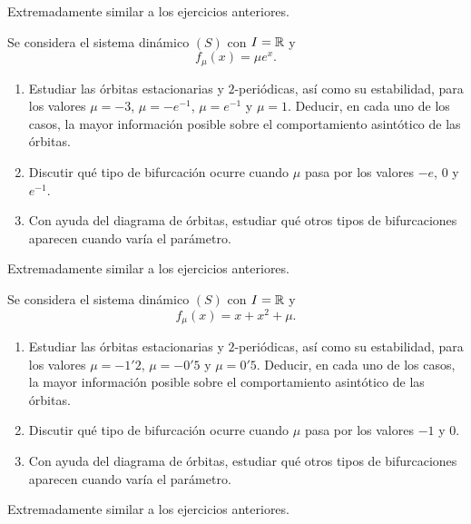 \documentclass[11pt]{report}
\begin{document}
\begin{solution}
    Extremadamente similar a los ejercicios anteriores.
\end{solution}

\begin{exercise}
    Se considera el sistema dinámico $(S)$ con $I = \mathbb R$ y
    \[f_\mu (x) = \mu e^x.\]
    \begin{enumerate}
        \item Estudiar las órbitas estacionarias y $2$-periódicas, así como su estabilidad, para los valores $\mu = -3$, $\mu = -e^{-1}$, $\mu = e^{-1}$ y $\mu = 1$. Deducir, en cada uno de los casos, la mayor información posible sobre el comportamiento asintótico de las órbitas.
        \item Discutir qué tipo de bifurcación ocurre cuando $\mu$ pasa por los valores $-e$, $0$ y $e^{-1}$.
        \item Con ayuda del diagrama de órbitas, estudiar qué otros tipos de bifurcaciones aparecen cuando varía el parámetro.
    \end{enumerate}
\end{exercise}

\begin{solution}
    Extremadamente similar a los ejercicios anteriores.
\end{solution}

\begin{exercise}
    Se considera el sistema dinámico $(S)$ con $I = \mathbb R$ y
    \[f_\mu (x) = x+x^2+\mu.\]
    \begin{enumerate}
        \item Estudiar las órbitas estacionarias y $2$-periódicas, así como su estabilidad, para los valores $\mu = -1'2$, $\mu = -0'5$ y $\mu = 0'5$. Deducir, en cada uno de los casos, la mayor información posible sobre el comportamiento asintótico de las órbitas.
        \item Discutir qué tipo de bifurcación ocurre cuando $\mu$ pasa por los valores $-1$ y $0$.
        \item Con ayuda del diagrama de órbitas, estudiar qué otros tipos de bifurcaciones aparecen cuando varía el parámetro.
    \end{enumerate}
\end{exercise}

\begin{solution}
    Extremadamente similar a los ejercicios anteriores.
\end{solution}
\end{document}
